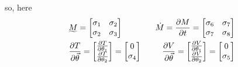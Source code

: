 \documentclass[conference]{IEEEtran}
\begin{document}
\hspace{20px} so, here
{\renewcommand{\arraystretch}{1.8}%
        \begin{align*}
            &\undertilde{M} = \begin{bmatrix}
                                 \sigma_1 & \sigma_2 \\
                                 \sigma_2 & \sigma_3 \\
                             \end{bmatrix} \hspace{8px}     &\dot{M}= \frac{\partial M}{\partial t} = \begin{bmatrix}
                                \sigma_6 & \sigma_7 \\
                                \sigma_7 & \sigma_8 \\
                            \end{bmatrix} \\
            &\frac{\partial T}{\partial \vec{\theta}} = \begin{bmatrix}
                                                           \frac{\partial T}{\partial \theta_1} \\
                                                           \frac{\partial T}{\partial \theta_2}
                                                       \end{bmatrix} = \begin{bmatrix}
                                                                           0 \\
                                                                           \sigma_4
                                                                       \end{bmatrix}\hspace{8px}
            &\frac{\partial V}{\partial \vec{\theta}} = \begin{bmatrix}
                                                           \frac{\partial V}{\partial \theta_1} \\
                                                           \frac{\partial V}{\partial \theta_2}
                                                       \end{bmatrix} = \begin{bmatrix}
                                                                           0 \\
                                                                           \sigma_5
                                                                       \end{bmatrix}
\end{align*}}
\end{document}
